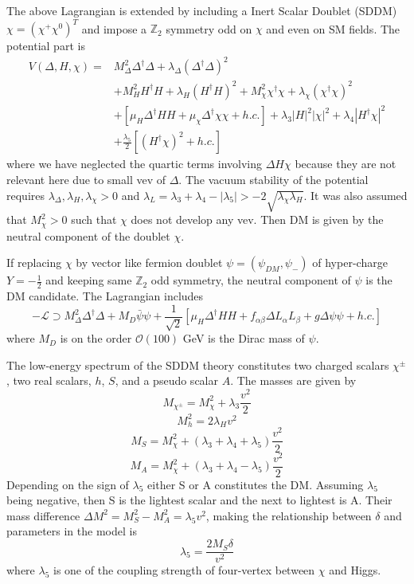 \documentclass[12pt]{article}
\begin{document}
The above Lagrangian is extended by including a Inert Scalar Doublet (SDDM) $\chi = (\chi^+ \chi^0)^T$ and impose a $\mathbb Z_2$  symmetry odd on $\chi$ and even on SM fields. The potential part is 
$$
\begin{aligned}
V(\Delta,H,\chi) = &
M_\Delta^2 \Delta^\dagger \Delta + \lambda_\Delta (\Delta^\dagger \Delta)^2\\
&
 + M_H^2 H^\dagger H + \lambda_H(H^\dagger H)^2 + M_\chi^2 \chi^\dagger \chi + \lambda_\chi (\chi^\dagger\chi)^2 \\
 &+
[ \mu_H \Delta^\dagger HH + \mu_\chi \Delta^\dagger \chi\chi + h.c.]
+
\lambda_3 |H|^2 |\chi|^2 + \lambda_4|H^\dagger\chi|^2 \\
&+
\frac{\lambda_5}{2}[(H^\dagger\chi)^2 + h.c.]
\end{aligned}
$$
where we have neglected the quartic terms involving $\Delta H \chi$ because they are not relevant here due to small vev of $\Delta$. The vacuum stability of the potential requires $\lambda_\Delta, \lambda_H, \lambda_\chi >0$ and $\lambda_L = \lambda_3+\lambda_4-|\lambda_5| > -2 \sqrt{\lambda_\chi \lambda_H}$. It was also assumed that $M_\chi^2 >0$ such that $\chi$ does not develop any vev. Then DM is given by the neutral component of the doublet $\chi$. 

If replacing $\chi$ by vector like fermion doublet $\psi = (\psi_{DM},\psi_-)$ of hyper-charge $Y=-\frac{1}{2}$ and keeping same $\mathbb Z_2$ odd symmetry, the neutral component of $\psi$ is the DM candidate. The Lagrangian includes
$$
-\mathcal L \supset M_\Delta^2 \Delta ^\dagger \Delta + M_D \bar \psi \psi + \frac{1}{\sqrt 2} [ \mu_H \Delta^\dagger HH + f_{\alpha\beta}\Delta L_\alpha L_\beta + g \Delta \psi \psi + h.c.]
$$
where $M_D$ is on the order $\mathcal O (100)$ GeV is the Dirac mass of $\psi$. 

The low-energy spectrum of the SDDM theory constitutes two charged scalars $\chi^{\pm}$, two real scalars, $h$, $S$, and a pseudo scalar $A$. The masses are given by 
$$
M_{\chi^{\pm}}= M_\chi^2 + \lambda_3 \frac{v^2}{2}
$$
$$
M_h^2 = 2 \lambda_H v^2
$$
$$
M_S= M_\chi^2 + (\lambda_3 + \lambda_4 + \lambda_5) \frac{v^2}{2}
$$
$$
M_A= M_\chi^2 + (\lambda_3 + \lambda_4 - \lambda_5) \frac{v^2}{2}
$$
Depending on the sign of $\lambda_5$ either S or A constitutes the DM. Assuming $\lambda_5$ being negative, then S is the lightest scalar and the next to lightest is A. Their mass difference $\Delta M^2 = M_S^2 - M_A^2 = \lambda_5 v^2$, making the relationship between $\delta$ and parameters in the model is
$$
\lambda_5 = \frac{2M_S \delta }{v^2}
$$
where $\lambda_5$ is one of the coupling strength of four-vertex between $\chi$ and Higgs. 
\end{document}
